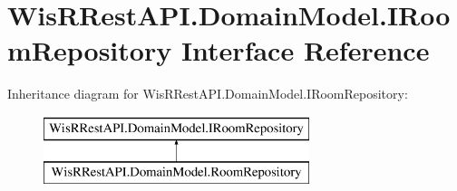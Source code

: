 \hypertarget{interface_wis_r_rest_a_p_i_1_1_domain_model_1_1_i_room_repository}{}\section{Wis\+R\+Rest\+A\+P\+I.\+Domain\+Model.\+I\+Room\+Repository Interface Reference}
\label{interface_wis_r_rest_a_p_i_1_1_domain_model_1_1_i_room_repository}
Inheritance diagram for Wis\+R\+Rest\+A\+P\+I.\+Domain\+Model.\+I\+Room\+Repository\+:\begin{figure}[H]
\begin{center}
\leavevmode
\includegraphics[height=2.000000cm]{interface_wis_r_rest_a_p_i_1_1_domain_model_1_1_i_room_repository}
\end{center}
\end{figure}
